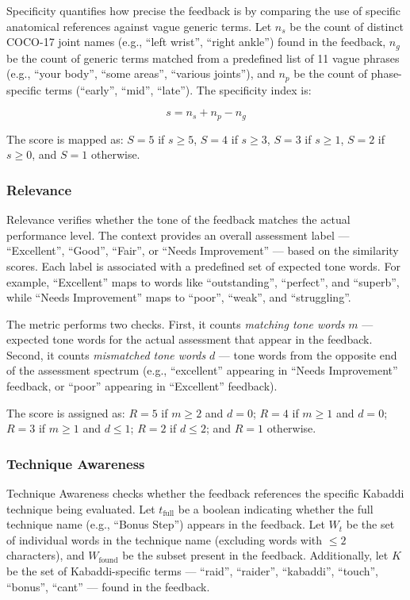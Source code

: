 Specificity quantifies how precise the feedback is by comparing the use of specific anatomical references against vague generic terms. Let $n_s$ be the count of distinct COCO-17 joint names (e.g., ``left wrist'', ``right ankle'') found in the feedback, $n_g$ be the count of generic terms matched from a predefined list of 11 vague phrases (e.g., ``your body'', ``some areas'', ``various joints''), and $n_p$ be the count of phase-specific terms (``early'', ``mid'', ``late''). The specificity index is:

\[
s = n_s + n_p - n_g
\]

The score is mapped as: $S = 5$ if $s \geq 5$, $S = 4$ if $s \geq 3$, $S = 3$ if $s \geq 1$, $S = 2$ if $s \geq 0$, and $S = 1$ otherwise.


\subsubsection{Relevance}

Relevance verifies whether the tone of the feedback matches the actual performance level. The context provides an overall assessment label --- ``Excellent'', ``Good'', ``Fair'', or ``Needs Improvement'' --- based on the similarity scores. Each label is associated with a predefined set of expected tone words. For example, ``Excellent'' maps to words like ``outstanding'', ``perfect'', and ``superb'', while ``Needs Improvement'' maps to ``poor'', ``weak'', and ``struggling''.

The metric performs two checks. First, it counts \textit{matching tone words} $m$ --- expected tone words for the actual assessment that appear in the feedback. Second, it counts \textit{mismatched tone words} $d$ --- tone words from the opposite end of the assessment spectrum (e.g., ``excellent'' appearing in ``Needs Improvement'' feedback, or ``poor'' appearing in ``Excellent'' feedback).

The score is assigned as: $R = 5$ if $m \geq 2$ and $d = 0$; $R = 4$ if $m \geq 1$ and $d = 0$; $R = 3$ if $m \geq 1$ and $d \leq 1$; $R = 2$ if $d \leq 2$; and $R = 1$ otherwise.


\subsubsection{Technique Awareness}

Technique Awareness checks whether the feedback references the specific Kabaddi technique being evaluated. Let $t_{\text{full}}$ be a boolean indicating whether the full technique name (e.g., ``Bonus Step'') appears in the feedback. Let $W_t$ be the set of individual words in the technique name (excluding words with $\leq 2$ characters), and $W_{\text{found}}$ be the subset present in the feedback. Additionally, let $K$ be the set of Kabaddi-specific terms --- ``raid'', ``raider'', ``kabaddi'', ``touch'', ``bonus'', ``cant'' --- found in the feedback.

